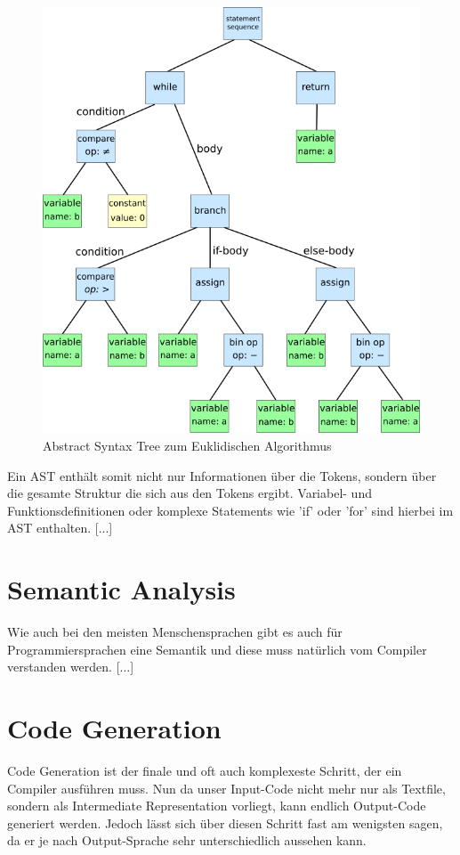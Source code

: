 \begin{figure}[h!]
    \centering
    \includegraphics[scale=0.3]{resources/syntaxtree.svg.png}
    \caption{Abstract Syntax Tree zum Euklidischen Algorithmus \cite{Parser:SyntaxTree}}
    \label{fig:syntax-tree}
\end{figure}

Ein AST enthält somit nicht nur Informationen über die Tokens, sondern über die gesamte Struktur die sich aus den Tokens ergibt. Variabel- und Funktionsdefinitionen oder komplexe Statements wie 'if' oder 'for' sind hierbei im AST enthalten.
[...]

\section{Semantic Analysis}
Wie auch bei den meisten Menschensprachen gibt es auch für Programmiersprachen eine Semantik und diese muss natürlich vom Compiler verstanden werden. [...]


\section{Code Generation}
Code Generation ist der finale und oft auch komplexeste Schritt, der ein Compiler ausführen muss. Nun da unser Input-Code nicht mehr nur als Textfile, sondern als Intermediate Representation vorliegt, kann endlich Output-Code generiert werden.
Jedoch lässt sich über diesen Schritt fast am wenigsten sagen, da er je nach Output-Sprache sehr unterschiedlich aussehen kann. 

